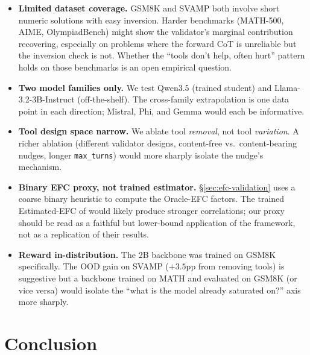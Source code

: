 \documentclass[10pt]{article}
\begin{document}
\begin{itemize}
  \item \textbf{Limited dataset coverage.} GSM8K and SVAMP both involve short numeric solutions with easy inversion. Harder benchmarks (MATH-500, AIME, OlympiadBench) might show the validator's marginal contribution recovering, especially on problems where the forward CoT is unreliable but the inversion check is not. Whether the ``tools don't help, often hurt'' pattern holds on those benchmarks is an open empirical question.
  \item \textbf{Two model families only.} We test Qwen3.5 (trained student) and Llama-3.2-3B-Instruct (off-the-shelf). The cross-family extrapolation is one data point in each direction; Mistral, Phi, and Gemma would each be informative.
  \item \textbf{Tool design space narrow.} We ablate tool \emph{removal}, not tool \emph{variation}. A richer ablation (different validator designs, content-free vs.\ content-bearing nudges, longer \texttt{max\_turns}) would more sharply isolate the nudge's mechanism.
  \item \textbf{Binary EFC proxy, not trained estimator.} \S\ref{sec:efc-validation} uses a coarse binary heuristic to compute the Oracle-EFC factors. The trained Estimated-EFC of \citep{efc2026} would likely produce stronger correlations; our proxy should be read as a faithful but lower-bound application of the framework, not as a replication of their results.
  \item \textbf{Reward in-distribution.} The 2B backbone was trained on GSM8K specifically. The OOD gain on SVAMP ($+3.5$pp from removing tools) is suggestive but a backbone trained on MATH and evaluated on GSM8K (or vice versa) would isolate the ``what is the model already saturated on?'' axis more sharply.
\end{itemize}

\section{Conclusion}
\end{document}

